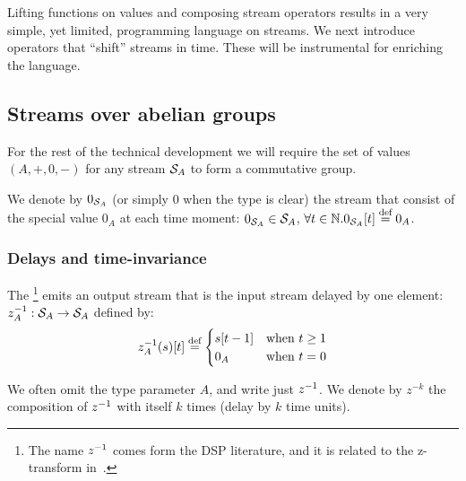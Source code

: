 

Lifting functions on values and composing stream operators results in a very simple, yet limited, programming language on streams.
We next introduce operators that ``shift'' streams in time.
These will be instrumental for enriching the language.

\subsection{Streams over abelian groups}\label{sec:abelian}

For the rest of the technical development we will require the set of values $(A, +, 0, -)$
for any stream $\mathcal{S}_{A}$ to form a commutative group.

We denote by $0_{\mathcal{S}_{A}}$ (or simply $0$ when the type is clear) the stream that consist of the special
value $0_A$ at each time moment: $0_{\mathcal{S}_{A}} \in \mathcal{S}_{A}$, $\forall t \in \mathbb{N} . 0_{\mathcal{S}_{A}}[t] \stackrel{\textrm{\scriptsize def}}{=} 0_A$.

\subsubsection{Delays and time-invariance}\label{sec:delay}

\begin{definition}[Delay]
The \footnote{The name $z^{-1}$
comes form the DSP literature, and it is related to the z-transform in~.} emits an output stream that is
the input stream delayed by one element: $z^{-1}_A: \mathcal{S}_{A} \to \mathcal{S}_{A}$ defined by:
$$
z^{-1}_A(s)[t] \stackrel{\textrm{\scriptsize def}}{=}  \begin{cases}
s[t - 1] & \text{when}~t\geq1\\
0_A      & \text{when}~t=0
\end{cases}
$$

We often omit the type parameter $A$, and write just $z^{-1}$.
We denote by $z^{-k}$ the composition of $z^{-1}$
with itself $k$ times (delay by $k$ time units).
\end{definition}

\begin{center}
\end{center}

